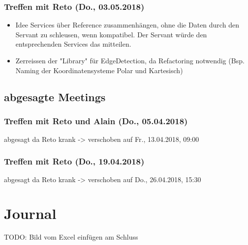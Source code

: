 \subsubsection{Treffen mit Reto (Do., 03.05.2018)}
\begin{itemize}
	\item Idee Services über Reference zusammenhängen, ohne die Daten durch den Servant zu schleusen, wenn kompatibel. Der Servant würde den entsprechenden Services das mitteilen.
	\item Zerreissen der "Library" für EdgeDetection, da Refactoring notwendig (Bsp. Naming der Koordinatensysteme Polar und Kartesisch)
\end{itemize}

\subsection{abgesagte Meetings}
\subsubsection{Treffen mit Reto und Alain (Do., 05.04.2018)}
abgesagt da Reto krank -> verschoben auf Fr., 13.04.2018, 09:00

\subsubsection{Treffen mit Reto (Do., 19.04.2018)}
abgesagt da Reto krank -> verschoben auf Do., 26.04.2018, 15:30

\section{Journal}
TODO: Bild vom Excel einfügen am Schluss